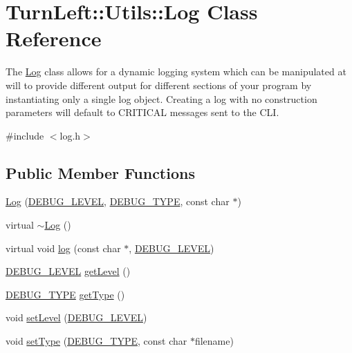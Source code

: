 \hypertarget{classTurnLeft_1_1Utils_1_1Log}{
\section{TurnLeft::Utils::Log Class Reference}
\label{classTurnLeft_1_1Utils_1_1Log}
}


The \hyperlink{classTurnLeft_1_1Utils_1_1Log}{Log} class allows for a dynamic logging system which can be manipulated at will to provide different output for different sections of your program by instantiating only a single log object. Creating a log with no construction parameters will default to CRITICAL messages sent to the CLI.  




{\ttfamily \#include $<$log.h$>$}

\subsection*{Public Member Functions}
\begin{DoxyCompactItemize}
\item 
\hyperlink{classTurnLeft_1_1Utils_1_1Log_aad9a535b7774066baec2ae69f95dc810}{Log} (\hyperlink{namespaceTurnLeft_1_1Utils_a55225b27548ba5d55b26a6a5f1ba294e}{DEBUG\_\-LEVEL}, \hyperlink{namespaceTurnLeft_1_1Utils_a9d1cba01e5417c6262d11cc154c9a252}{DEBUG\_\-TYPE}, const char $\ast$)
\item 
virtual \hyperlink{classTurnLeft_1_1Utils_1_1Log_ac04ffbc97a2d6689843fd11492fe8911}{$\sim$Log} ()
\item 
virtual void \hyperlink{classTurnLeft_1_1Utils_1_1Log_ac14c5605af087f81b2c99b1c267af13d}{log} (const char $\ast$, \hyperlink{namespaceTurnLeft_1_1Utils_a55225b27548ba5d55b26a6a5f1ba294e}{DEBUG\_\-LEVEL})
\item 
\hyperlink{namespaceTurnLeft_1_1Utils_a55225b27548ba5d55b26a6a5f1ba294e}{DEBUG\_\-LEVEL} \hyperlink{classTurnLeft_1_1Utils_1_1Log_a388ce24cc5be57d7b625d760b6ef708e}{getLevel} ()
\item 
\hyperlink{namespaceTurnLeft_1_1Utils_a9d1cba01e5417c6262d11cc154c9a252}{DEBUG\_\-TYPE} \hyperlink{classTurnLeft_1_1Utils_1_1Log_a94ca126124af5c0f1058f60e1130d94b}{getType} ()
\item 
void \hyperlink{classTurnLeft_1_1Utils_1_1Log_a88c51f5e9b80a18eb9c79340d2551557}{setLevel} (\hyperlink{namespaceTurnLeft_1_1Utils_a55225b27548ba5d55b26a6a5f1ba294e}{DEBUG\_\-LEVEL})
\item 
void \hyperlink{classTurnLeft_1_1Utils_1_1Log_ad27d1e632681c4cf80f352682e63df06}{setType} (\hyperlink{namespaceTurnLeft_1_1Utils_a9d1cba01e5417c6262d11cc154c9a252}{DEBUG\_\-TYPE}, const char $\ast$filename)
\end{DoxyCompactItemize}
